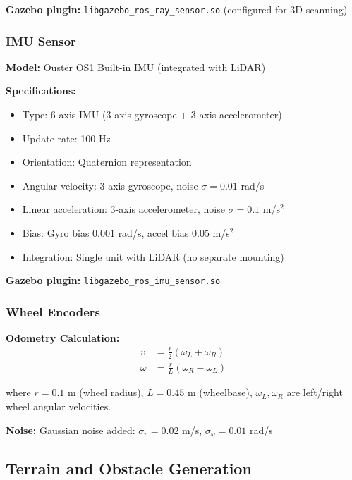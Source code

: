 \textbf{Gazebo plugin:} \texttt{libgazebo\_ros\_ray\_sensor.so} (configured for 3D scanning)

\subsubsection{IMU Sensor}

\textbf{Model:} Ouster OS1 Built-in IMU (integrated with LiDAR)

\textbf{Specifications:}
\begin{itemize}
    \item Type: 6-axis IMU (3-axis gyroscope + 3-axis accelerometer)
    \item Update rate: 100 Hz
    \item Orientation: Quaternion representation
    \item Angular velocity: 3-axis gyroscope, noise $\sigma = 0.01$ rad/s
    \item Linear acceleration: 3-axis accelerometer, noise $\sigma = 0.1$ m/s$^2$
    \item Bias: Gyro bias $0.001$ rad/s, accel bias $0.05$ m/s$^2$
    \item Integration: Single unit with LiDAR (no separate mounting)
\end{itemize}

\textbf{Gazebo plugin:} \texttt{libgazebo\_ros\_imu\_sensor.so}

\subsubsection{Wheel Encoders}

\textbf{Odometry Calculation:}
\begin{equation}
\begin{aligned}
v &= \frac{r}{2}(\omega_L + \omega_R) \\
\omega &= \frac{r}{L}(\omega_R - \omega_L)
\end{aligned}
\label{eq:wheel_odometry}
\end{equation}

where $r = 0.1$ m (wheel radius), $L = 0.45$ m (wheelbase), $\omega_L, \omega_R$ are left/right wheel angular velocities.

\textbf{Noise:} Gaussian noise added: $\sigma_v = 0.02$ m/s, $\sigma_\omega = 0.01$ rad/s

\subsection{Terrain and Obstacle Generation}

